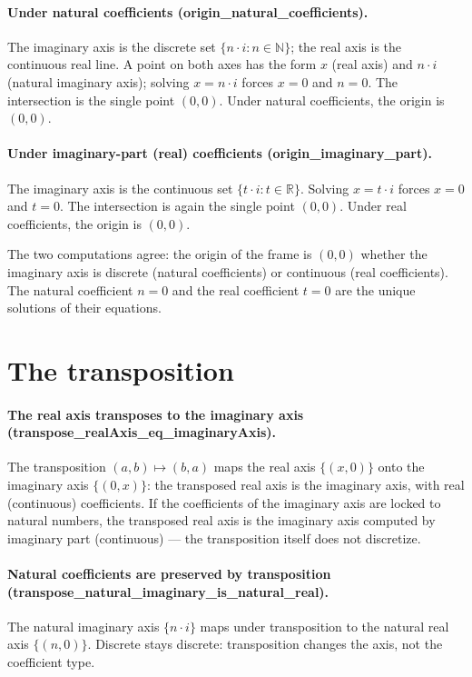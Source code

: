 \documentclass[sigplan,10pt,anonymous,review]{acmart}
\begin{document}
\paragraph{Under natural coefficients (origin\_natural\_coefficients).}
The imaginary axis is the discrete set $\{n \cdot i : n \in
\mathbb{N}\}$; the real axis is the continuous real line. A point on
both axes has the form $x$ (real axis) and $n \cdot i$ (natural
imaginary axis); solving $x = n \cdot i$ forces $x = 0$ and $n = 0$.
The intersection is the single point $(0,0)$. Under natural
coefficients, the origin is $(0,0)$.

\paragraph{Under imaginary-part (real) coefficients
(origin\_imaginary\_part).} The imaginary axis is the continuous set
$\{t \cdot i : t \in \mathbb{R}\}$. Solving $x = t \cdot i$ forces
$x = 0$ and $t = 0$. The intersection is again the single point
$(0,0)$. Under real coefficients, the origin is $(0,0)$.

The two computations agree: the origin of the frame is $(0,0)$ whether
the imaginary axis is discrete (natural coefficients) or continuous
(real coefficients). The natural coefficient $n = 0$ and the real
coefficient $t = 0$ are the unique solutions of their equations.

\section{The transposition}

\paragraph{The real axis transposes to the imaginary axis
(transpose\_realAxis\_eq\_imaginaryAxis).} The transposition
$(a,b) \mapsto (b,a)$ maps the real axis $\{(x, 0)\}$ onto the
imaginary axis $\{(0, x)\}$: the transposed real axis is the imaginary
axis, with real (continuous) coefficients. If the coefficients of the
imaginary axis are locked to natural numbers, the transposed real axis
is the imaginary axis computed by imaginary part (continuous) --- the
transposition itself does not discretize.

\paragraph{Natural coefficients are preserved by transposition
(transpose\_natural\_imaginary\_is\_natural\_real).} The natural
imaginary axis $\{n \cdot i\}$ maps under transposition to the natural
real axis $\{(n, 0)\}$. Discrete stays discrete: transposition changes
the axis, not the coefficient type.
\end{document}
